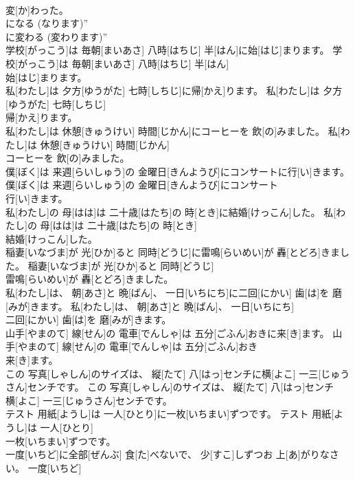 \documentclass[8pt]{extreport}
\begin{document}
\begin{CJK}{UTF8}{min}
\\	変[か]わった。	
\\	になる (なります)” 
\\	に変わる (変わります)”
\\	学校[がっこう]は 毎朝[まいあさ] 八時[はちじ] 半[はん]に始[はじ]まります。	学校[がっこう]は 毎朝[まいあさ] 八時[はちじ] 半[はん]
\\	始[はじ]まります。	
\\	私[わたし]は 夕方[ゆうがた] 七時[しちじ]に帰[かえ]ります。	私[わたし]は 夕方[ゆうがた] 七時[しちじ]
\\	帰[かえ]ります。	
\\	私[わたし]は 休憩[きゅうけい] 時間[じかん]にコーヒーを 飲[の]みました。	私[わたし]は 休憩[きゅうけい] 時間[じかん]
\\	コーヒーを 飲[の]みました。	
\\	僕[ぼく]は 来週[らいしゅう]の 金曜日[きんようび]にコンサートに行[い]きます。	僕[ぼく]は 来週[らいしゅう]の 金曜日[きんようび]にコンサート
\\	行[い]きます。	
\\	私[わたし]の 母[はは]は 二十歳[はたち]の 時[とき]に結婚[けっこん]した。	私[わたし]の 母[はは]は 二十歳[はたち]の 時[とき]
\\	結婚[けっこん]した。	
\\	稲妻[いなづま]が 光[ひか]ると 同時[どうじ]に雷鳴[らいめい]が 轟[とどろ]きました。	稲妻[いなづま]が 光[ひか]ると 同時[どうじ]
\\	雷鳴[らいめい]が 轟[とどろ]きました。	
\\	私[わたし]は、 朝[あさ]と 晩[ばん]、 一日[いちにち]に二回[にかい] 歯[は]を 磨[みが]きます。	私[わたし]は、 朝[あさ]と 晩[ばん]、 一日[いちにち]
\\	二回[にかい] 歯[は]を 磨[みが]きます。	
\\	山手[やまのて] 線[せん]の 電車[でんしゃ]は 五分[ごふん]おきに来[き]ます。	山手[やまのて] 線[せん]の 電車[でんしゃ]は 五分[ごふん]おき
\\	来[き]ます。	
\\	この 写真[しゃしん]のサイズは、 縦[たて] 八[はっ]センチに横[よこ] 一三[じゅうさん]センチです。	この 写真[しゃしん]のサイズは、 縦[たて] 八[はっ]センチ
\\	横[よこ] 一三[じゅうさん]センチです。	
\\	テスト 用紙[ようし]は 一人[ひとり]に一枚[いちまい]ずつです。	テスト 用紙[ようし]は 一人[ひとり]
\\	一枚[いちまい]ずつです。	
\\	一度[いちど]に全部[ぜんぶ] 食[た]べないで、 少[すこ]しずつお 上[あ]がりなさい。	一度[いちど]

\end{CJK}
\end{document}
